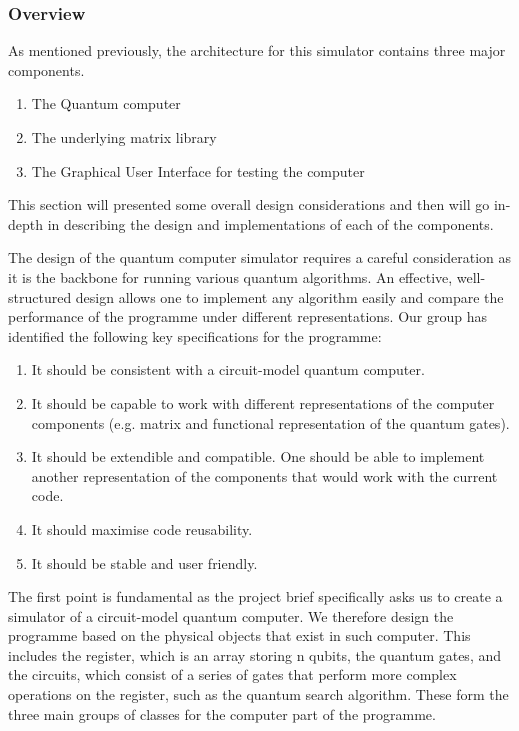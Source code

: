 \documentclass[bibliography=totocnumbered, 10pt]{article}
\theoremstyle{NoticeStyle}
\begin{document}
%
\subsubsection{Overview}
As mentioned previously, the architecture for this simulator contains three major components.
\begin{enumerate}
	\item The Quantum computer
	\item The underlying matrix library
	\item The Graphical User Interface for testing the computer
\end{enumerate}
This section will presented some overall design considerations and then will go in-depth in describing the design and implementations of each of the components.

The design of the quantum computer simulator requires a careful consideration as it is the backbone for running various quantum algorithms. An effective, well-structured design allows one to implement any algorithm easily and compare the performance of the programme under different representations. Our group has identified the following key specifications for the programme:
\begin{enumerate}
	\item It should be consistent with a circuit-model quantum computer. 
	\item It should be capable to work with different representations of the computer components (e.g. matrix and functional representation of the quantum gates).
	\item It should be extendible and compatible. One should be able to implement another representation of the components that would work with the current code.
	\item It should maximise code reusability.
	\item It should be stable and user friendly.
\end{enumerate}
The first point is fundamental as the project brief specifically asks us to create a simulator of a circuit-model quantum computer. We therefore design the programme based on the physical objects that exist in such computer. This includes the register, which is an array storing n qubits, the quantum gates, and the circuits, which consist of a series of gates that perform more complex operations on the register, such as the quantum search algorithm. These form the three main groups of classes for the computer part of the programme. 
\end{document}
